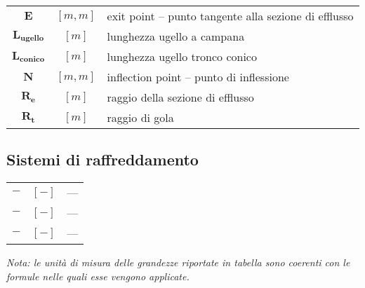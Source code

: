 \begin{multicols}{2}
\begin{tabularx}{\linewidth}{cc>{\raggedright\arraybackslash}X}
		$\bm{E}$ & $[m, m]$ & exit point – punto tangente alla sezione di efflusso  \\
		$\bm{L_{ugello}}$ & $[m]$ & lunghezza ugello a campana \\
	        $\bm{L_{conico}}$ & $[m]$ & lunghezza ugello tronco conico \\
		$\bm{N}$ & $[m, m]$ & inflection point – punto di inflessione \\
		$\bm{R_e}$ & $[m]$ & raggio della sezione di efflusso \\
        $\bm{R_t}$ & $[m]$ & raggio di gola
	\end{tabularx}

	\subsection{Sistemi di raffreddamento}
	\begin{tabularx}{\linewidth}{cc>{\raggedright\arraybackslash}X}
		$\bm{-}$ & $[-]$ & --- \\
		$\bm{-}$ & $[-]$ & --- \\
		$\bm{-}$ & $[-]$ & ---
	\end{tabularx}

\end{multicols}

\textit{Nota: le unità di misura delle grandezze riportate in tabella sono coerenti con le formule nelle quali esse vengono applicate.}